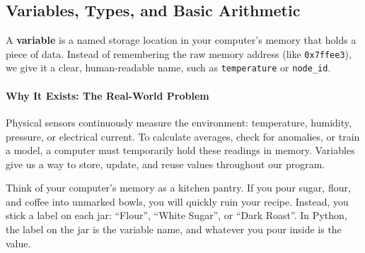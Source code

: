 \subsection{Variables, Types, and Basic Arithmetic}

\begin{keyidea}
A \textbf{variable} is a named storage location in your computer's memory that holds a piece of data. Instead of remembering the raw memory address (like \texttt{0x7ffee3}), we give it a clear, human-readable name, such as \texttt{temperature} or \texttt{node\_id}.
\end{keyidea}

\paragraph{Why It Exists: The Real-World Problem}
Physical sensors continuously measure the environment: temperature, humidity, pressure, or electrical current. To calculate averages, check for anomalies, or train a model, a computer must temporarily hold these readings in memory. Variables give us a way to store, update, and reuse values throughout our program.

\begin{analogy}
Think of your computer's memory as a kitchen pantry. If you pour sugar, flour, and coffee into unmarked bowls, you will quickly ruin your recipe. Instead, you stick a label on each jar: ``Flour'', ``White Sugar'', or ``Dark Roast''. In Python, the label on the jar is the variable name, and whatever you pour inside is the value.
\end{analogy}

